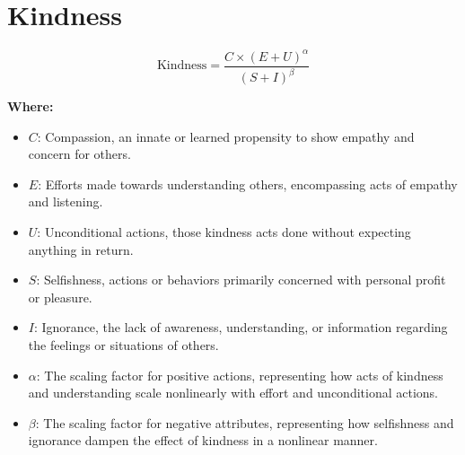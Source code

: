 \chapter{Kindness}

\begin{equation}
\text{Kindness} = \frac{{C \times (E + U)^\alpha}}{{(S + I)^{\beta}}}
\end{equation}

\textbf{Where:}

\begin{itemize}
    \item $C$: Compassion, an innate or learned propensity to show empathy and concern for others.
    \item $E$: Efforts made towards understanding others, encompassing acts of empathy and listening.
    \item $U$: Unconditional actions, those kindness acts done without expecting anything in return.
    \item $S$: Selfishness, actions or behaviors primarily concerned with personal profit or pleasure.
    \item $I$: Ignorance, the lack of awareness, understanding, or information regarding the feelings or situations of others.
    \item $\alpha$: The scaling factor for positive actions, representing how acts of kindness and understanding scale nonlinearly with effort and unconditional actions.
    \item $\beta$: The scaling factor for negative attributes, representing how selfishness and ignorance dampen the effect of kindness in a nonlinear manner.
\end{itemize}
